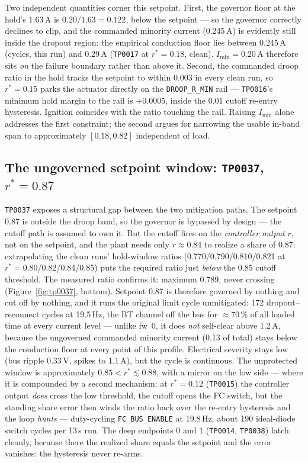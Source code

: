 \documentclass[11pt]{article}
\newcommand{\code}[1]{\texttt{#1}}
\begin{document}
Two independent quantities corner this setpoint. First, the governor floor at the
hold's 1.63\,A is $0.20/1.63=0.122$, below the setpoint --- so the governor
correctly declines to clip, and the commanded minority current (0.245\,A) is
evidently still inside the dropout region: the empirical conduction floor lies
between 0.245\,A (cycles, this run) and 0.29\,A (\code{TP0017} at $r^\ast=0.18$,
clean). $I_\mathrm{min}=0.20$\,A therefore sits \emph{on} the failure boundary
rather than above it. Second, the commanded droop ratio in the hold tracks the
setpoint to within 0.003 in every clean run, so $r^\ast=0.15$ parks the actuator
directly on the \code{DROOP\_R\_MIN} rail --- \code{TP0016}'s minimum hold margin to
the rail is $+0.0005$, inside the 0.01 cutoff re-entry hysteresis. Ignition
coincides with the ratio touching the rail. Raising $I_\mathrm{min}$ alone
addresses the first constraint; the second argues for narrowing the usable in-band
span to approximately $[0.18, 0.82]$ independent of load.

\subsection{The ungoverned setpoint window: \code{TP0037}, $r^\ast=0.87$}
\label{sec:gap}

\code{TP0037} exposes a structural gap between the two mitigation paths. The
setpoint 0.87 is outside the droop band, so the governor is bypassed by design ---
the cutoff path is assumed to own it. But the cutoff fires on the \emph{controller
output} $r$, not on the setpoint, and the plant needs only $r\approx0.84$ to
realize a share of 0.87: extrapolating the clean runs' hold-window ratios
(0.770/0.790/0.810/0.821 at $r^\ast=0.80$/0.82/0.84/0.85) puts the required ratio
just \emph{below} the 0.85 cutoff threshold. The measured ratio confirms it:
maximum 0.789, never crossing (Figure~\ref{fig:tp0037}, bottom). Setpoint 0.87 is
therefore governed by nothing and cut off by nothing, and it runs the original
limit cycle unmitigated: 172 dropout--reconnect cycles at 19.5\,Hz, the BT channel
off the bus for $\approx$70\,\% of all loaded time at every current level ---
unlike fw~0, it does \emph{not} self-clear above 1.2\,A, because the ungoverned
commanded minority current (0.13 of total) stays below the conduction floor at
every point of this profile. Electrical severity stays low (bus ripple 0.33\,V,
spikes to 1.1\,A), but the cycle is continuous. The unprotected window is
approximately $0.85<r^\ast\lesssim0.88$, with a mirror on the low side --- where it
is compounded by a second mechanism: at $r^\ast=0.12$ (\code{TP0015}) the
controller output \emph{does} cross the low threshold, the cutoff opens the FC
switch, but the standing share error then winds the ratio back over the re-entry
hysteresis and the loop \emph{hunts} --- duty-cycling \code{FC\_BUS\_ENABLE} at
19.8\,Hz, about 190 ideal-diode switch cycles per 13\,s run. The deep endpoints 0
and 1 (\code{TP0014}, \code{TP0038}) latch cleanly, because there the realized
share equals the setpoint and the error vanishes: the hysteresis never re-arms.
\end{document}
